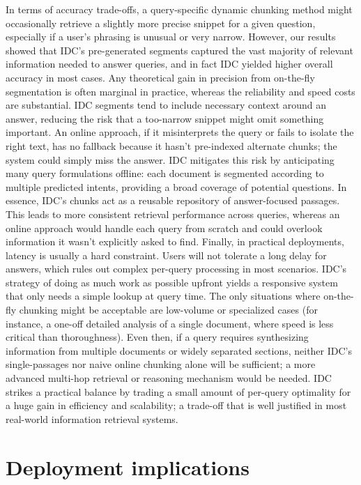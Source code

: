\documentclass[12pt,a4paper]{report}
\begin{document}
In terms of accuracy trade-offs, a query-specific dynamic chunking method might occasionally retrieve a slightly more precise snippet for a given question, especially if a user's phrasing is unusual or very narrow. However, our results showed that IDC's pre-generated segments captured the vast majority of relevant information needed to answer queries, and in fact IDC yielded higher overall accuracy in most cases. Any theoretical gain in precision from on-the-fly segmentation is often marginal in practice, whereas the reliability and speed costs are substantial. IDC segments tend to include necessary context around an answer, reducing the risk that a too-narrow snippet might omit something important. An online approach, if it misinterprets the query or fails to isolate the right text, has no fallback because it hasn't pre-indexed alternate chunks; the system could simply miss the answer. IDC mitigates this risk by anticipating many query formulations offline: each document is segmented according to multiple predicted intents, providing a broad coverage of potential questions. In essence, IDC's chunks act as a reusable repository of answer-focused passages. This leads to more consistent retrieval performance across queries, whereas an online approach would handle each query from scratch and could overlook information it wasn't explicitly asked to find. Finally, in practical deployments, latency is usually a hard constraint. Users will not tolerate a long delay for answers, which rules out complex per-query processing in most scenarios. IDC's strategy of doing as much work as possible upfront yields a responsive system that only needs a simple lookup at query time. The only situations where on-the-fly chunking might be acceptable are low-volume or specialized cases (for instance, a one-off detailed analysis of a single document, where speed is less critical than thoroughness). Even then, if a query requires synthesizing information from multiple documents or widely separated sections, neither IDC's single-passages nor naive online chunking alone will be sufficient; a more advanced multi-hop retrieval or reasoning mechanism would be needed. IDC strikes a practical balance by trading a small amount of per-query optimality for a huge gain in efficiency and scalability; a trade-off that is well justified in most real-world information retrieval systems.

\section{Deployment implications}
\end{document}
